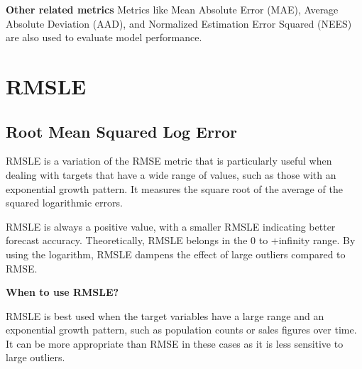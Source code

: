 \textbf{Other related metrics}
Metrics like Mean Absolute Error (MAE), Average Absolute Deviation (AAD), and Normalized Estimation Error Squared (NEES) are also used to evaluate model performance.

\clearpage
\thispagestyle{regressionstyle}
\section{RMSLE}
\subsection{Root Mean Squared Log Error}

RMSLE is a variation of the RMSE metric that is particularly useful when dealing with targets that have a wide range of values, such as those with an exponential growth pattern.
It measures the square root of the average of the squared logarithmic errors.

\begin{center}
\end{center}

RMSLE is always a positive value, with a smaller RMSLE indicating better forecast accuracy. Theoretically, RMSLE belongs in the 0 to +infinity range.
By using the logarithm, RMSLE dampens the effect of large outliers compared to RMSE.

\textbf{When to use RMSLE?}

RMSLE is best used when the target variables have a large range and an exponential growth pattern, such as population counts or sales figures over time.
It can be more appropriate than RMSE in these cases as it is less sensitive to large outliers.

